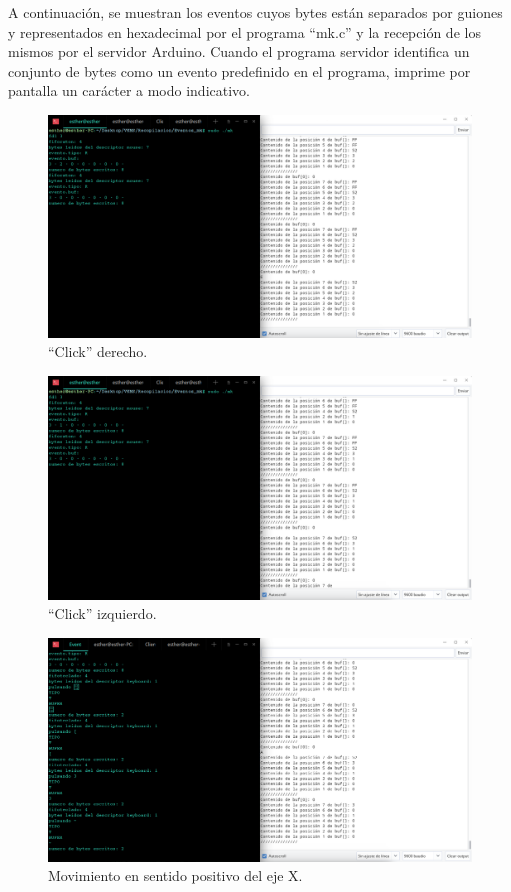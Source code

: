 A continuación, se muestran los eventos cuyos bytes están separados por guiones y representados en hexadecimal por el programa ``mk.c'' y la recepción de los mismos por el servidor Arduino. Cuando el programa servidor identifica un conjunto de bytes como un evento predefinido en el programa, imprime por pantalla un carácter a modo indicativo.

    \begin{figure}
    \centering
    \includegraphics[scale = 0.45]{capitulo_04/figuras_dir/clickder2.jpg}
    \caption{``Click'' derecho.}
    \end{figure}

    \begin{figure}
    \centering
    \includegraphics[scale = 0.45]{capitulo_04/figuras_dir/clickizq2.jpg}
    \caption{``Click'' izquierdo.}
    \end{figure}

    \begin{figure}
    \centering
    \includegraphics[scale = 0.45]{capitulo_04/figuras_dir/movx+.jpg}
    \caption{Movimiento en sentido positivo del eje X.}
    \end{figure}

